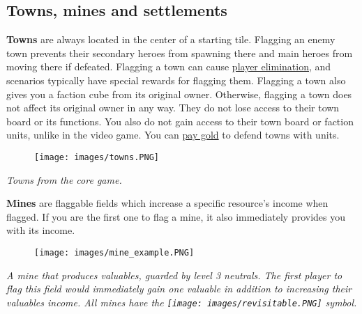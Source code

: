 \documentclass[12pt]{article}
\begin{document}
\clearpage
\subsection*{Towns, mines and settlements}
\textbf{Towns} are always located in the center of a starting tile. Flagging an enemy town prevents their secondary heroes from spawning there and main heroes from moving there if defeated. Flagging a town can cause \hyperlink{End}{player elimination}, and scenarios typically have special rewards for flagging them. Flagging a town also gives you a faction cube from its original owner. Otherwise, flagging a town does not affect its original owner in any way. They do not lose access to their town board or its functions. You also do not gain access to their town board or faction units, unlike in the video game. You can \hyperlink{Town}{pay gold} to defend towns with units.\\
\begin{figure}[h]
\centering
\texttt{[image: images/towns.PNG]}
\end{figure}
\begin{center}
\textit{Towns from the core game.}
\end{center}
\textbf{Mines} are flaggable fields which increase a specific resource's income when flagged. If you are the first one to flag a mine, it also immediately provides you with its income.
\begin{figure}[h]
\centering
\texttt{[image: images/mine\_example.PNG]}
\end{figure}
\begin{center}
\textit{A mine that produces valuables, guarded by level 3 neutrals. The first player to flag this field would immediately gain one valuable in addition to increasing their valuables income. All mines have the \texttt{[image: images/revisitable.PNG]} symbol.}
\end{center}
\end{document}
